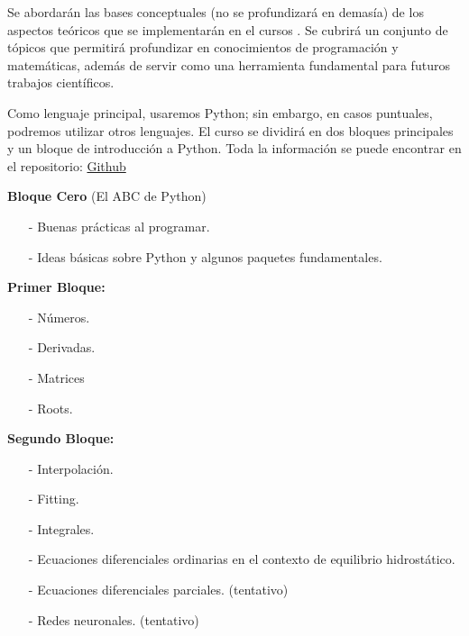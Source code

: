 \documentclass[12pt]{amsart} %
\begin{document}
Se abordarán las bases conceptuales (no se profundizará en demasía) de los aspectos teóricos que se implementarán en el cursos . Se cubrirá un conjunto de tópicos que permitirá profundizar en conocimientos de programación y matemáticas, además de servir como una herramienta fundamental para futuros trabajos científicos.
\vspace{8pt}


Como lenguaje principal, usaremos Python; sin embargo, en casos puntuales, podremos utilizar otros lenguajes. El curso se dividirá en dos bloques principales y un bloque de introducción a Python. Toda la información se puede encontrar en el repositorio: \href{https://github.com/Mandy8808/Metodos_Numericos_2024.git}{Github}

\vspace{8pt}

\textbf{Bloque Cero} (El ABC de Python)
\begin{enumerate}
	\item[-] Buenas prácticas al programar.
	\item[-] Ideas básicas sobre Python y algunos paquetes fundamentales.
\end{enumerate}

\textbf{Primer Bloque:}
\begin{itemize}
	\item[-] Números.
	\item[-] Derivadas.
	\item[-] Matrices
	\item[-] Roots.
\end{itemize}

\textbf{Segundo Bloque:}
\begin{itemize}
	\item[-] Interpolación.
	\item[-] Fitting.
	\item[-] Integrales.
	\item[-] Ecuaciones diferenciales ordinarias en el contexto de equilibrio hidrostático.
	\item[-] Ecuaciones diferenciales parciales. (tentativo)
	\item[-] Redes neuronales. (tentativo)
\end{itemize}
\end{document}
